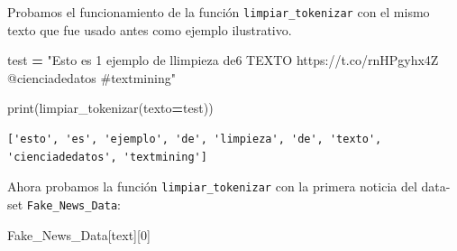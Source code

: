 \documentclass[
  11pt,
  a4paper,
]{article}
\newenvironment{Shaded}{\begin{snugshade}}{\end{snugshade}}
\newcommand{\BuiltInTok}[1]{#1}
\newcommand{\DecValTok}[1]{\textcolor[rgb]{0.00,0.00,0.81}{#1}}
\newcommand{\NormalTok}[1]{#1}
\newcommand{\OperatorTok}[1]{\textcolor[rgb]{0.81,0.36,0.00}{\textbf{#1}}}
\newcommand{\StringTok}[1]{\textcolor[rgb]{0.31,0.60,0.02}{#1}}
\begin{document}
Probamos el funcionamiento de la función \texttt{limpiar\_tokenizar} con
el mismo texto que fue usado antes como ejemplo ilustrativo.

\begin{Shaded}
\begin{Highlighting}[]

\NormalTok{test }\OperatorTok{=} \StringTok{"Esto es 1 ejemplo de l\textquotesingle{}limpieza de6 TEXTO  https://t.co/rnHPgyhx4Z @cienciadedatos \#textmining"}

\BuiltInTok{print}\NormalTok{(limpiar\_tokenizar(texto}\OperatorTok{=}\NormalTok{test))}
\end{Highlighting}
\end{Shaded}

\begin{verbatim}
['esto', 'es', 'ejemplo', 'de', 'limpieza', 'de', 'texto', 'cienciadedatos', 'textmining']
\end{verbatim}

Ahora probamos la función \texttt{limpiar\_tokenizar} con la primera
noticia del data-set \texttt{Fake\_News\_Data}:

\begin{Shaded}
\begin{Highlighting}[]
\NormalTok{Fake\_News\_Data[}\StringTok{\textquotesingle{}text\textquotesingle{}}\NormalTok{][}\DecValTok{0}\NormalTok{]}
\end{Highlighting}
\end{Shaded}
\end{document}
